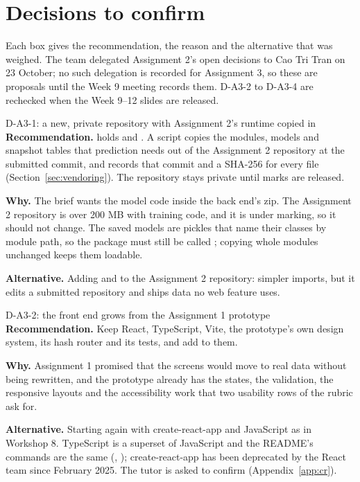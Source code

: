 \section{Decisions to confirm}
\label{sec:decisions}

Each box gives the recommendation, the reason and the alternative that was weighed. The team
delegated Assignment 2's open decisions to Cao Tri Tran on 23 October; no such delegation is
recorded for Assignment 3, so these are proposals until the Week 9 meeting records them. D-A3-2 to
D-A3-4 are rechecked when the Week 9--12 slides are released.

\begin{decision}{D-A3-1: a new, private repository with Assignment 2's runtime copied in}
\textbf{Recommendation.}  holds  and . A script copies
the modules, models and snapshot tables that prediction needs out of the Assignment 2 repository at
the submitted commit, and records that commit and a SHA-256 for every file
(Section~\ref{sec:vendoring}). The repository stays private until marks are released.

\textbf{Why.} The brief wants the model code inside the back end's zip. The Assignment 2 repository
is over 200 MB with training code, and it is under marking, so it should not change. The saved
models are pickles that name their classes by module path, so the package must still be called
; copying whole modules unchanged keeps them loadable.

\textbf{Alternative.} Adding  and  to the Assignment 2 repository:
simpler imports, but it edits a submitted repository and ships data no web feature uses.
\end{decision}

\begin{decision}{D-A3-2: the front end grows from the Assignment 1 prototype}
\textbf{Recommendation.} Keep React, TypeScript, Vite, the prototype's own design system, its hash
router and its tests, and add to them.

\textbf{Why.} Assignment 1 promised that the screens would move to real data without being
rewritten, and the prototype already has the states, the validation, the responsive layouts and the
accessibility work that two usability rows of the rubric ask for.

\textbf{Alternative.} Starting again with create-react-app and JavaScript as in Workshop 8.
TypeScript is a superset of JavaScript and the README's commands are the same (,
); create-react-app has been deprecated by the React team since February 2025.
The tutor is asked to confirm (Appendix~\ref{app:cr}).
\end{decision}

